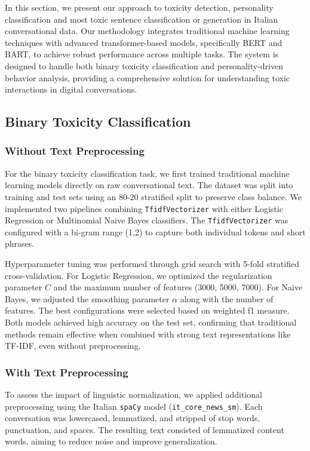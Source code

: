 \documentclass[conference]{IEEEtran}
\begin{document}
In this section, we present our approach to toxicity detection, personality classification and most toxic sentence classification or generation in Italian conversational data. Our methodology integrates traditional machine learning techniques with advanced transformer-based models, specifically BERT and BART, to achieve robust performance across multiple tasks. The system is designed to handle both binary toxicity classification and personality-driven behavior analysis, providing a comprehensive solution for understanding toxic interactions in digital conversations.

\subsection{Binary Toxicity Classification}

\subsubsection{Without Text Preprocessing}

For the binary toxicity classification task, we first trained traditional machine learning models directly on raw conversational text. The dataset was split into training and test sets using an 80-20 stratified split to preserve class balance. We implemented two pipelines combining \texttt{TfidfVectorizer} with either Logistic Regression or Multinomial Naive Bayes classifiers. The \texttt{TfidfVectorizer} was configured with a bi-gram range (1,2) to capture both individual tokens and short phrases.

Hyperparameter tuning was performed through grid search with 5-fold stratified cross-validation. For Logistic Regression, we optimized the regularization parameter \(C\) and the maximum number of features (3000, 5000, 7000). For Naive Bayes, we adjusted the smoothing parameter \(\alpha\) along with the number of features. The best configurations were selected based on weighted f1 measure. Both models achieved high accuracy on the test set, confirming that traditional methods remain effective when combined with strong text representations like TF-IDF, even without preprocessing.

\subsubsection{With Text Preprocessing}

To assess the impact of linguistic normalization, we applied additional preprocessing using the Italian \texttt{spaCy} model (\texttt{it\_core\_news\_sm}). Each conversation was lowercased, lemmatized, and stripped of stop words, punctuation, and spaces. The resulting text consisted of lemmatized content words, aiming to reduce noise and improve generalization.
\end{document}
